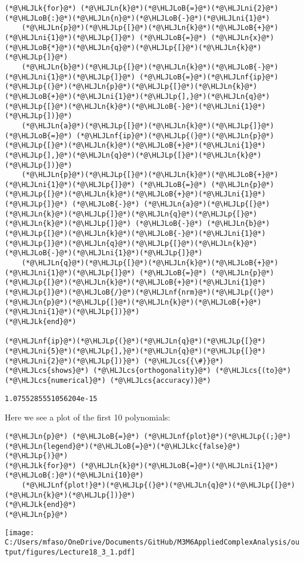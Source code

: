 \documentclass[12pt,a4paper]{article}
\newcommand{\HLJLk}[1]{\textcolor[RGB]{148,91,176}{\textbf{#1}}}
\newcommand{\HLJLkc}[1]{\textcolor[RGB]{59,151,46}{\textit{#1}}}
\newcommand{\HLJLn}[1]{#1}
\newcommand{\HLJLnf}[1]{\textcolor[RGB]{66,102,213}{#1}}
\newcommand{\HLJLni}[1]{\textcolor[RGB]{59,151,46}{#1}}
\newcommand{\HLJLoB}[1]{\textcolor[RGB]{102,102,102}{\textbf{#1}}}
\newcommand{\HLJLp}[1]{#1}
\newcommand{\HLJLcs}[1]{\textcolor[RGB]{153,153,119}{\textit{#1}}}
\begin{document}
\begin{lstlisting}
(*@\HLJLk{for}@*) (*@\HLJLn{k}@*)(*@\HLJLoB{=}@*)(*@\HLJLni{2}@*)(*@\HLJLoB{:}@*)(*@\HLJLn{n}@*)(*@\HLJLoB{-}@*)(*@\HLJLni{1}@*)
    (*@\HLJLn{p}@*)(*@\HLJLp{[}@*)(*@\HLJLn{k}@*)(*@\HLJLoB{+}@*)(*@\HLJLni{1}@*)(*@\HLJLp{]}@*) (*@\HLJLoB{=}@*) (*@\HLJLn{x}@*)(*@\HLJLoB{*}@*)(*@\HLJLn{q}@*)(*@\HLJLp{[}@*)(*@\HLJLn{k}@*)(*@\HLJLp{]}@*)
    (*@\HLJLn{b}@*)(*@\HLJLp{[}@*)(*@\HLJLn{k}@*)(*@\HLJLoB{-}@*)(*@\HLJLni{1}@*)(*@\HLJLp{]}@*) (*@\HLJLoB{=}@*)(*@\HLJLnf{ip}@*)(*@\HLJLp{(}@*)(*@\HLJLn{p}@*)(*@\HLJLp{[}@*)(*@\HLJLn{k}@*)(*@\HLJLoB{+}@*)(*@\HLJLni{1}@*)(*@\HLJLp{],}@*)(*@\HLJLn{q}@*)(*@\HLJLp{[}@*)(*@\HLJLn{k}@*)(*@\HLJLoB{-}@*)(*@\HLJLni{1}@*)(*@\HLJLp{])}@*)
    (*@\HLJLn{a}@*)(*@\HLJLp{[}@*)(*@\HLJLn{k}@*)(*@\HLJLp{]}@*) (*@\HLJLoB{=}@*) (*@\HLJLnf{ip}@*)(*@\HLJLp{(}@*)(*@\HLJLn{p}@*)(*@\HLJLp{[}@*)(*@\HLJLn{k}@*)(*@\HLJLoB{+}@*)(*@\HLJLni{1}@*)(*@\HLJLp{],}@*)(*@\HLJLn{q}@*)(*@\HLJLp{[}@*)(*@\HLJLn{k}@*)(*@\HLJLp{])}@*)
    (*@\HLJLn{p}@*)(*@\HLJLp{[}@*)(*@\HLJLn{k}@*)(*@\HLJLoB{+}@*)(*@\HLJLni{1}@*)(*@\HLJLp{]}@*) (*@\HLJLoB{=}@*) (*@\HLJLn{p}@*)(*@\HLJLp{[}@*)(*@\HLJLn{k}@*)(*@\HLJLoB{+}@*)(*@\HLJLni{1}@*)(*@\HLJLp{]}@*) (*@\HLJLoB{-}@*) (*@\HLJLn{a}@*)(*@\HLJLp{[}@*)(*@\HLJLn{k}@*)(*@\HLJLp{]}@*)(*@\HLJLn{q}@*)(*@\HLJLp{[}@*)(*@\HLJLn{k}@*)(*@\HLJLp{]}@*) (*@\HLJLoB{-}@*) (*@\HLJLn{b}@*)(*@\HLJLp{[}@*)(*@\HLJLn{k}@*)(*@\HLJLoB{-}@*)(*@\HLJLni{1}@*)(*@\HLJLp{]}@*)(*@\HLJLn{q}@*)(*@\HLJLp{[}@*)(*@\HLJLn{k}@*)(*@\HLJLoB{-}@*)(*@\HLJLni{1}@*)(*@\HLJLp{]}@*)
    (*@\HLJLn{q}@*)(*@\HLJLp{[}@*)(*@\HLJLn{k}@*)(*@\HLJLoB{+}@*)(*@\HLJLni{1}@*)(*@\HLJLp{]}@*) (*@\HLJLoB{=}@*) (*@\HLJLn{p}@*)(*@\HLJLp{[}@*)(*@\HLJLn{k}@*)(*@\HLJLoB{+}@*)(*@\HLJLni{1}@*)(*@\HLJLp{]}@*)(*@\HLJLoB{/}@*)(*@\HLJLnf{nrm}@*)(*@\HLJLp{(}@*)(*@\HLJLn{p}@*)(*@\HLJLp{[}@*)(*@\HLJLn{k}@*)(*@\HLJLoB{+}@*)(*@\HLJLni{1}@*)(*@\HLJLp{])}@*)
(*@\HLJLk{end}@*)

(*@\HLJLnf{ip}@*)(*@\HLJLp{(}@*)(*@\HLJLn{q}@*)(*@\HLJLp{[}@*)(*@\HLJLni{5}@*)(*@\HLJLp{],}@*)(*@\HLJLn{q}@*)(*@\HLJLp{[}@*)(*@\HLJLni{2}@*)(*@\HLJLp{])}@*) (*@\HLJLcs{{\#}}@*) (*@\HLJLcs{shows}@*) (*@\HLJLcs{orthogonality}@*) (*@\HLJLcs{(to}@*) (*@\HLJLcs{numerical}@*) (*@\HLJLcs{accuracy)}@*)
\end{lstlisting}

\begin{lstlisting}
1.0755285551056204e-15
\end{lstlisting}


Here we see a plot of the first 10 polynomials:


\begin{lstlisting}
(*@\HLJLn{p}@*) (*@\HLJLoB{=}@*) (*@\HLJLnf{plot}@*)(*@\HLJLp{(;}@*) (*@\HLJLn{legend}@*)(*@\HLJLoB{=}@*)(*@\HLJLkc{false}@*)(*@\HLJLp{)}@*)
(*@\HLJLk{for}@*) (*@\HLJLn{k}@*)(*@\HLJLoB{=}@*)(*@\HLJLni{1}@*)(*@\HLJLoB{:}@*)(*@\HLJLni{10}@*)
    (*@\HLJLnf{plot!}@*)(*@\HLJLp{(}@*)(*@\HLJLn{q}@*)(*@\HLJLp{[}@*)(*@\HLJLn{k}@*)(*@\HLJLp{])}@*)
(*@\HLJLk{end}@*)
(*@\HLJLn{p}@*)
\end{lstlisting}

\texttt{[image: C:/Users/mfaso/OneDrive/Documents/GitHub/M3M6AppliedComplexAnalysis/output/figures/Lecture18\_3\_1.pdf]}
\end{document}
